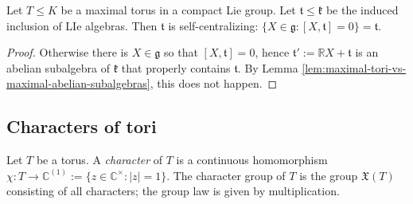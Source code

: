\documentclass[reqno]{amsart} 
\begin{document}
\begin{corollary}\label{cor:self-centralizing-algebra-of-maximal-torus}
  Let $T \leq K$ be a maximal torus in a compact Lie group.  Let $\mathfrak{t} \leq \mathfrak{k}$ be the induced inclusion of LIe algebras.  Then $\mathfrak{t}$ is self-centralizing: $\{X \in \mathfrak{g} : [X,\mathfrak{t}] = 0\} = \mathfrak{t}$.
\end{corollary}
\begin{proof}
  Otherwise there is $X \in \mathfrak{g}$ so that $[X,\mathfrak{t}] = 0$, hence $\mathfrak{t} ' := \mathbb{R} X + \mathfrak{t}$ is an abelian subalgebra of $\mathfrak{k}$ that properly contains $\mathfrak{t}$.  By Lemma \ref{lem:maximal-tori-vs-maximal-abelian-subalgebras}, this does not happen.
\end{proof}

\subsection{Characters of tori}
\label{sec:org56989a6}
\begin{definition}
  Let $T$ be a torus.  A \emph{character} of $T$ is a continuous homomorphism $\chi : T \rightarrow \mathbb{C}^{(1)} := \{z \in \mathbb{C}^\times : |z| = 1\}$.  The character group of $T$ is the group $\mathfrak{X}(T)$ consisting of all characters; the group law is given by multiplication.
\end{definition}

\end{document}
